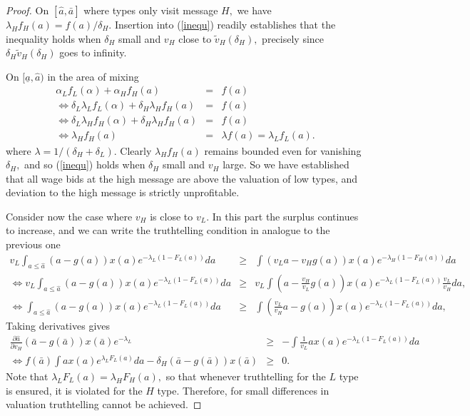 \documentclass[12pt]{article}
\begin{document}
\begin{proof}
On $[\hat{a},\bar{a}]$ where types only visit message $H,$ we have $\lambda_{H}f_{H}(a)=f(a)/\delta _{H}.$ Insertion into (\ref{inequ}) readily establishes that the inequality holds when $\delta _{H}$ small and $v_{H}$ close to $\tilde{v}_{H}(\delta _{H}),$ precisely since $\delta _{H}\tilde{v}_{H}(\delta _{H})$ goes to infinity.

On $[\underline{a},\hat{a})$ in the area of mixing 
\begin{eqnarray*}
\alpha _{L}f_{L}(\alpha )+\alpha _{H}f_{H}(a) &=&f(a) \\
\Leftrightarrow \delta _{L}\lambda _{L}f_{L}(\alpha )+\delta _{H}\lambda
_{H}f_{H}(a) &=&f(a) \\
\Leftrightarrow \delta _{L}\lambda _{H}f_{H}(\alpha )+\delta _{H}\lambda
_{H}f_{H}(a) &=&f(a) \\
\Leftrightarrow \lambda _{H}f_{H}(a) &=&\lambda f(a)=\lambda _{L}f_{L}(a).
\end{eqnarray*}%
where $\lambda =1/(\delta _{H}+\delta _{L})$. Clearly $\lambda _{H}f_{H}(a)$ remains bounded even for vanishing $\delta _{H},$ and so (\ref{inequ}) holds when $\delta _{H}$ small and $v_{H}$ large.
So we have established that all wage bids at the high message are above the valuation of low types, and deviation to the high message is strictly unprofitable.

Consider now the case where $v_{H}$ is close to $v_{L}.$ In this part the surplus continues to increase, and we can write the truthtelling condition in analogue to the previous one%
\begin{eqnarray}
v_{L}\int_{a\leq \hat{a}}(a-g(a))x(a)e^{-\lambda _{L}(1-F_{L}(a))}da &\geq
&\int (v_{L}a-v_{H}g(a))x(a)e^{-\lambda _{H}(1-F_{H}(a))}da  \nonumber \\
\Longleftrightarrow v_{L}\int_{a\leq \hat{a}}(a-g(a))x(a)e^{-\lambda
_{L}(1-F_{L}(a))}da &\geq &v_{L}\int (a-\frac{v_{H}}{v_{L}}%
g(a))x(a)e^{-\lambda _{L}(1-F_{L}(a))}\frac{v_{L}}{v_{H}}da,  \nonumber \\
\Longleftrightarrow \int_{a\leq \hat{a}}(a-g(a))x(a)e^{-\lambda
_{L}(1-F_{L}(a))}da &\geq &\int (\frac{v_{L}}{v_{H}}a-g(a))x(a)e^{-\lambda
_{L}(1-F_{L}(a))}da,
\end{eqnarray}%
Taking derivatives gives%
\begin{eqnarray*}
\frac{\partial \hat{a}}{\partial v_{H}}(\bar{a}-g(\bar{a}))x(\bar{a}%
)e^{-\lambda _{L}} &\geq &-\int \frac{1}{v_{L}}ax(a)e^{-\lambda
_{L}(1-F_{L}(a))}da \\
\Leftrightarrow f(\bar{a})\int ax(a)e^{\lambda _{L}F_{L}(a)}da-\delta _{H}(%
\bar{a}-g(\bar{a}))x(\bar{a}) &\geq &0.
\end{eqnarray*}%
Note that $\lambda _{L}F_{L}(a)=\lambda _{H}F_{H}(a),$ so that whenever truthtelling for the $L$ type is ensured, it is violated for the $H$ type.
Therefore, for small differences in valuation truthtelling cannot be achieved.
\end{proof}
\end{document}
